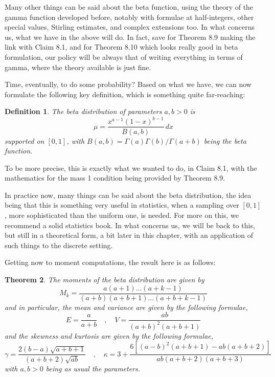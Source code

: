 \documentclass[12pt]{amsbook}
\newtheorem{theorem}{Theorem}[chapter]
\newtheorem{definition}[theorem]{Definition}
\begin{document}
Many other things can be said about the beta function, using the theory of the gamma function developed before, notably with formulae at half-integers, other special values, Stirling estimates, and complex extensions too. In what concerns us, what we have in the above will do. In fact, save for Theorem 8.9 making the link with Claim 8.1, and for Theorem 8.10 which looks really good in beta formulation, our policy will be always that of writing everything in terms of gamma, where the theory available is just fine.

\bigskip

Time, eventually, to do some probability? Based on what we have, we can now formulate the following key definition, which is something quite far-reaching:

\begin{definition}
The beta distribution of parameters $a,b>0$ is
$$\mu=\frac{x^{a-1}(1-x)^{b-1}}{B(a,b)}\,dx$$
supported on $[0,1]$, with $B(a,b)=\Gamma(a)\Gamma(b)/\Gamma(a+b)$ being the beta function.
\end{definition}

To be more precise, this is exactly what we wanted to do, in Claim 8.1, with the mathematics for the mass 1 condition being provided by Theorem 8.9.

\bigskip

In practice now, many things can be said about the beta distribution, the idea being that this is something very useful in statistics, when a sampling over $[0,1]$, more sophisticated than the uniform one, is needed. For more on this, we recommend a solid statistics book. In what concerns us, we will be back to this, but still in a theoretical form, a bit later in this chapter, with an application of such things to the discrete setting.

\bigskip

Getting now to moment computations, the result here is as follows:

\begin{theorem}
The moments of the beta distribution are given by
$$M_k=\frac{a(a+1)\ldots(a+k-1)}{(a+b)(a+b+1)\ldots(a+b+k-1)}$$
and in particular, the mean and variance are given by the following formulae,
$$E=\frac{a}{a+b}\quad,\quad V=\frac{ab}{(a+b)^2(a+b+1)}$$
and the skewness and kurtosis are given by the following formulae,
$$\gamma=\frac{2(b-a)\sqrt{a+b+1}}{(a+b+2)\sqrt{ab}}\quad,\quad
\kappa=3+\frac{6[(a-b)^2(a+b+1)-ab(a+b+2)]}{ab(a+b+2)(a+b+3)}$$
with $a,b>0$ being as usual the parameters.
\end{theorem}
\end{document}
